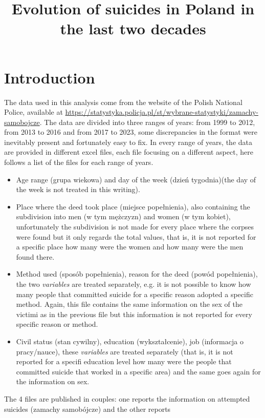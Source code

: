 \documentclass{article}
\title{Evolution of suicides in Poland in the last two decades}
\begin{document}
 

\maketitle

\section{Introduction}
%
The data used in this analysis come from the website of the Polish National
Police, available at 
\url{https://statystyka.policja.pl/st/wybrane-statystyki/zamachy-samobojcze}. 
The data are divided into three ranges of years: from 1999 to 2012,
from 2013 to 2016 and from 2017 to 2023, some discrepancies in the format
were inevitably present and fortunately easy to fix.
In every range of years, the data are provided in different excel files,
each file focusing on a different aspect,
here follows a list of the files for each range of years.
\begin{itemize}
\item Age range (grupa wiekowa) and day of the week (dzień tygodnia)(the day of the week is not 
treated in this writing).
\item Place where the deed took place (miejsce popełnienia), also containing
the subdivision into men (w tym mężczyzn) and women (w tym kobiet),
unfortunately the subdivision is not made for every place where 
the corpses were found but it only regards the total values, that is,
it is not reported for a specific place how many were the women and how many were
the men found there.
\item Method used (sposób popełnienia), 
reason for the deed  (powód popełnienia), the two \textit{variables}
are treated separately, e.g. it is not possible to know how many people
that committed suicide for a specific reason adopted a specific method.
Again, this file contains the same information on the sex of the victimi as in
the previous file but
this information is not reported for every specific reason or method.
\item Civil status (stan cywilny), education (wykształcenie),
job (informacja o pracy/nauce), these \textit{variables} are treated
separately (that is, it is not reported for a specifi education level how many were the 
people that committed suicide that worked in a specific area)
and the same goes again for the information on sex.
\end{itemize}
The 4 files are published in couples: one reports the information on
attempted suicides (zamachy samobójcze) and the other reports 
\end{document}
